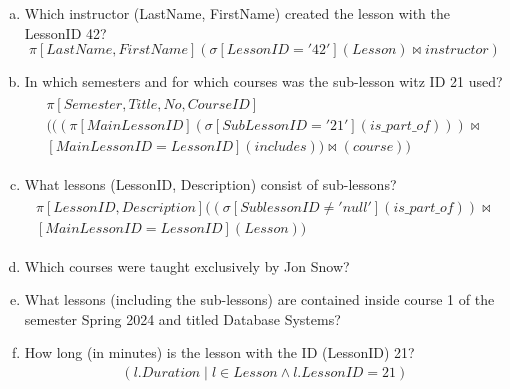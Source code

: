 \documentclass{article}
\begin{document}
\printfront

\task{}

\begin{enumerate}[(a)]
\item
Which instructor (LastName, FirstName) created the lesson with the LessonID 42?
\begin{equation}
\pi\left[LastName,FirstName\right](\sigma\left[LessonID='42'\right](Lesson)\Join instructor)
\end{equation}

\item
In which semesters and for which courses was the sub-lesson witz ID 21 used?
\begin{align}
    \begin{split}
\pi\left[Semester, Title, No, CourseID\right]\\
(((\pi\left[MainLessonID\right](\sigma\left[SubLessonID = '21'\right](is\_part\_of)))\Join \\
\left[MainLessonID = LessonID\right](includes))\Join(course))
    \end{split}
\end{align}

\item
What lessons (LessonID, Description) consist of sub-lessons?
\begin{align}
    \begin{split}
\pi\left[LessonID,Description\right]((\sigma\left[SublessonID\neq'null'\right](is\_part\_of))\Join \\
\left[MainLessonID=LessonID\right](Lesson))
    \end{split}
\end{align}

\item
Which courses were taught exclusively by Jon Snow?

\item 
What lessons (including the sub-lessons) are contained inside course 1 of the semester Spring 2024 and titled Database Systems?

\item How long (in minutes) is the lesson with the ID (LessonID) 21?
\begin{align}
    (l.Duration \mid l \in Lesson \wedge l.LessonID = 21)
\end{align}


\end{enumerate}
\end{document}
